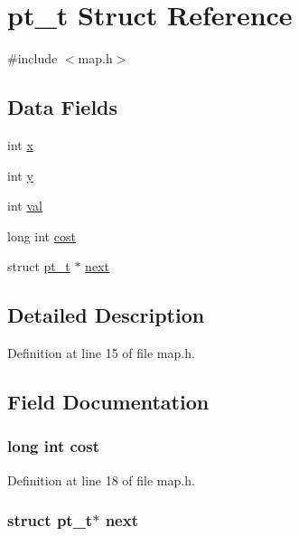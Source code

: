 \hypertarget{structpt__t}{\section{pt\-\_\-t Struct Reference}
\label{structpt__t}
}


{\ttfamily \#include $<$map.\-h$>$}

\subsection*{Data Fields}
\begin{DoxyCompactItemize}
\item 
int \hyperlink{structpt__t_a6150e0515f7202e2fb518f7206ed97dc}{x}
\item 
int \hyperlink{structpt__t_a0a2f84ed7838f07779ae24c5a9086d33}{y}
\item 
int \hyperlink{structpt__t_aa0ccb5ee6d882ee3605ff47745c6467b}{val}
\item 
long int \hyperlink{structpt__t_a9f2dafabe0c6f59d1b086dda0c1dd0d6}{cost}
\item 
struct \hyperlink{structpt__t}{pt\-\_\-t} $\ast$ \hyperlink{structpt__t_a7c9e6bfcedcf078ff419e19152eaac3d}{next}
\end{DoxyCompactItemize}


\subsection{Detailed Description}


Definition at line 15 of file map.\-h.



\subsection{Field Documentation}
\hypertarget{structpt__t_a9f2dafabe0c6f59d1b086dda0c1dd0d6}{
\subsubsection[{cost}]{\setlength{\rightskip}{0pt plus 5cm}long int cost}}\label{structpt__t_a9f2dafabe0c6f59d1b086dda0c1dd0d6}


Definition at line 18 of file map.\-h.

\hypertarget{structpt__t_a7c9e6bfcedcf078ff419e19152eaac3d}{
\subsubsection[{next}]{\setlength{\rightskip}{0pt plus 5cm}struct {\bf pt\-\_\-t}$\ast$ next}}\label{structpt__t_a7c9e6bfcedcf078ff419e19152eaac3d}


